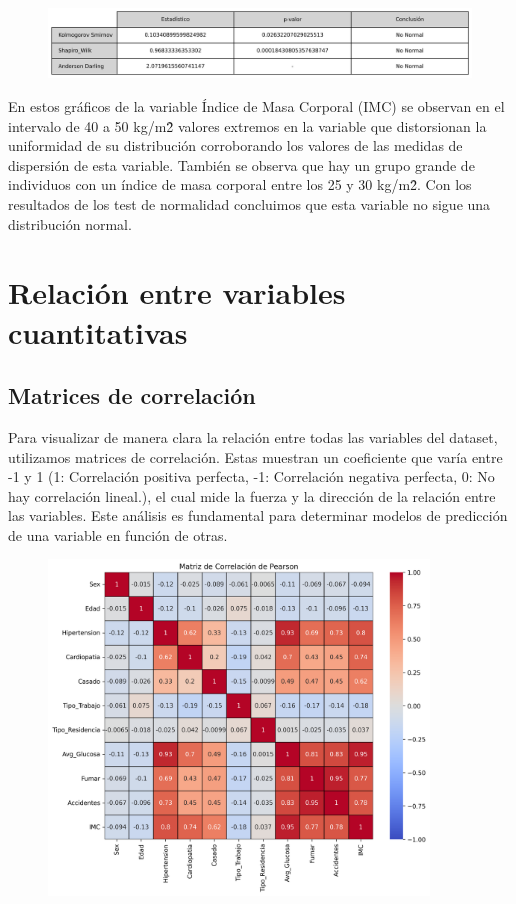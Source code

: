 \documentclass[a4paper, 12pt]{article}
\begin{document}
\begin{figure}[H]
    \centering
    \includegraphics[width=1\textwidth]{img/Tablas/test_normalidad_IMC.png}
\end{figure}


En estos gráficos de la variable Índice de Masa Corporal (IMC) se observan en el intervalo de 40 a 50 kg/m\^2 valores extremos en 
la variable que distorsionan la uniformidad de su distribución corroborando los valores de las medidas de dispersión de esta variable. 
También se observa que hay un grupo grande de individuos con un índice de masa corporal entre los 25 y 30 kg/m\^2. Con los resultados 
de los test de normalidad concluimos que esta variable no sigue una distribución normal.









\newpage


\section{Relación entre variables cuantitativas}

\subsection{Matrices de correlación}
Para visualizar de manera clara la relación entre todas las variables del dataset, utilizamos matrices de correlación. Estas muestran un coeficiente que varía entre -1 y 1 (1: Correlación positiva perfecta, -1: Correlación negativa perfecta, 0: No hay correlación lineal.), el cual mide la fuerza y la dirección de la relación entre las variables. Este análisis es fundamental para determinar modelos de predicción de una variable en función de otras.
\begin{figure}[H]
    \centering
    \includegraphics[width=0.9\textwidth]{img/matriz_correlacion_pearson.png}
\end{figure}
\end{document}

